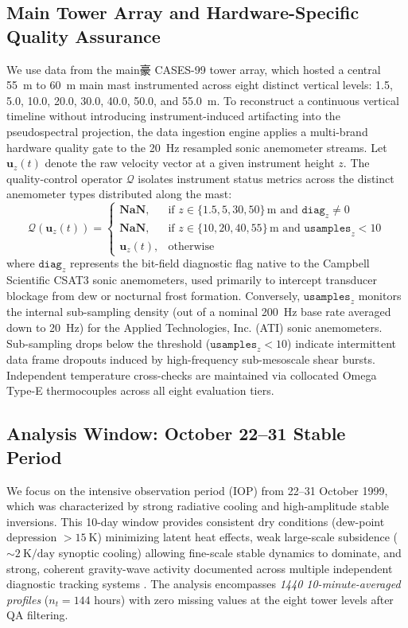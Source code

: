 \documentclass[11pt,a4paper]{article}
\begin{document}
\subsection{Main Tower Array and Hardware-Specific Quality Assurance}
We use data from the main豪 CASES-99 tower array, which hosted a central \SI{55}{\meter} to \SI{60}{\meter} main mast instrumented across eight distinct vertical levels: 1.5, 5.0, 10.0, 20.0, 30.0, 40.0, 50.0, and \SI{55.0}{\meter}. To reconstruct a continuous vertical timeline without introducing instrument-induced artifacting into the pseudospectral projection, the data ingestion engine applies a multi-brand hardware quality gate to the 20~Hz resampled sonic anemometer streams. Let $\mathbf{u}_z(t)$ denote the raw velocity vector at a given instrument height $z$. The quality-control operator $\mathcal{Q}$ isolates instrument status metrics across the distinct anemometer types distributed along the mast:
\begin{equation}
\mathcal{Q}\left(\mathbf{u}_z(t)\right) =
\begin{cases}
\mathbf{NaN}, & \text{if } z \in \{1.5, 5, 30, 50\}\,\text{m and } \mathtt{diag}_z \neq 0 \\
\mathbf{NaN}, & \text{if } z \in \{10, 20, 40, 55\}\,\text{m and } \mathtt{usamples}_z < 10 \\
\mathbf{u}_z(t), & \text{otherwise}
\end{cases}
\end{equation}
where $\mathtt{diag}_z$ represents the bit-field diagnostic flag native to the Campbell Scientific CSAT3 sonic anemometers, used primarily to intercept transducer blockage from dew or nocturnal frost formation. Conversely, $\mathtt{usamples}_z$ monitors the internal sub-sampling density (out of a nominal 200~Hz base rate averaged down to 20~Hz) for the Applied Technologies, Inc. (ATI) sonic anemometers. Sub-sampling drops below the threshold ($\mathtt{usamples}_z < 10$) indicate intermittent data frame dropouts induced by high-frequency sub-mesoscale shear bursts. Independent temperature cross-checks are maintained via collocated Omega Type-E thermocouples across all eight evaluation tiers.

\subsection{Analysis Window: October 22--31 Stable Period}

We focus on the intensive observation period (IOP) from 22--31 October 1999, which was characterized by strong radiative cooling and high-amplitude stable inversions. This 10-day window provides consistent dry conditions (dew-point depression $> \SI{15}{\kelvin}$) minimizing latent heat effects, weak large-scale subsidence ($\sim \SI{2}{\kelvin\per\text{day}}$ synoptic cooling) allowing fine-scale stable dynamics to dominate, and strong, coherent gravity-wave activity documented across multiple independent diagnostic tracking systems \citep{Poulos2002}. The analysis encompasses \emph{1440 10-minute-averaged profiles} ($n_t = 144$ hours) with zero missing values at the eight tower levels after QA filtering.
\end{document}
